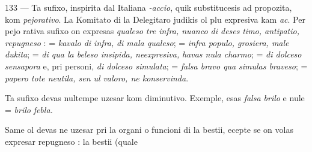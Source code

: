 \begin{VUpage}[137]{133}
 --- Ta sufixo, inspirita dal Italiana \textit{-accio}, quik\nl
substitucesis ad  propozita, kom \textit{pejorativo}. La Komitato\nl
di la Delegitaro judikis ol plu expresiva kam \textit{ac}. Per pejo\cc
rativa sufixo on expresas \textit{qualeso tre infra, nuanco di deses}\cc
\textit{timo, antipatio, repugneso} :  = \textit{kavalo di infra,}\nl
\textit{di mala qualeso};  = \textit{infra populo, grosiera, male}\cc
\textit{dukita};  = \textit{di qua la beleso insipida, neexpresiva,}\nl
\textit{havas nula charmo};  = \textit{di dolceso sensapora} e, pri\nl
personi, \textit{di dolceso simulata};  = \textit{falsa bravo qua}\nl
\textit{simulas braveso};  = \textit{papero tote neutila, sen ul}\nl
\textit{valoro, ne konservinda}. \nl
{}\nl
{}

Ta sufixo devas nultempe uzesar kom diminutivo.\nl
Exemple,  esas \textit{falsa brilo} e nule  = \textit{brilo}\nl
\textit{febla.}

Same ol devas ne uzesar pri la organi o funcioni di la\nl
bestii, ecepte se on volas expresar repugneso : la bestii (quale\parplein
\end{VUpage}

